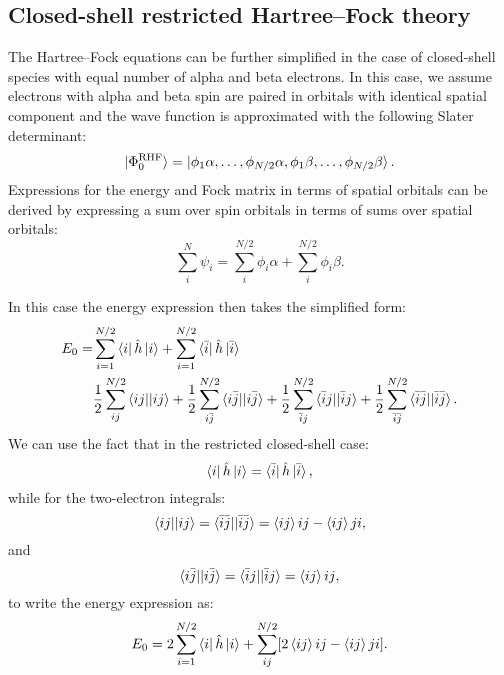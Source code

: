 \documentclass[../Main/chem532-notes.tex]{subfiles}
\begin{document}
\subsection{Closed-shell restricted Hartree--Fock theory}
The Hartree--Fock equations can be further simplified in the case of closed-shell species with equal number of alpha and beta electrons.
In this case, we assume electrons with alpha and beta spin are paired in orbitals with identical spatial component and the wave function is approximated with the following Slater determinant:
\begin{equation}
\ket{\Phi_0^\mathrm{RHF}} = \ket{\phi_1 \alpha,\ldots, \phi_{N/2} \alpha,
\phi_1 \beta,\ldots, \phi_{N/2} \beta}.
\end{equation}
Expressions for the energy and Fock matrix in terms of spatial orbitals can be derived by expressing a sum over spin orbitals in terms of sums over spatial orbitals:
\begin{equation}
\sum_{i}^{N} \psi_i = \sum_{i}^{N/2} \phi_i \alpha + \sum_{i}^{N/2} \phi_i \beta.
\end{equation}

In this case the energy expression then takes the simplified form:
\begin{equation}
\begin{split}
E_0 =& \sum_{i=1}^{N/2} \bra{i} \hat{h} \ket{i} + \sum_{i = 1}^{N/2} \bra{\bar{i}} \hat{h} \ket{\bar{i}} \\
& \frac{1}{2} \sum_{ij}^{N/2} \bra{ij}\!\ket{ij}
+ \frac{1}{2} \sum_{i\bar{j}}^{N/2} \bra{i\bar{j}}\!\ket{i\bar{j}}
+ \frac{1}{2} \sum_{\bar{i}j}^{N/2} \bra{\bar{i}j}\!\ket{\bar{i}j}
+ \frac{1}{2} \sum_{\bar{i}\bar{j}}^{N/2} \bra{\bar{i}\bar{j}}\!\ket{\bar{i}\bar{j}}.
\end{split}
\end{equation}
We can use the fact that in the restricted closed-shell case:
\begin{equation}
\bra{i} \hat{h} \ket{i} = \bra{\bar{i}} \hat{h} \ket{\bar{i}},
\end{equation}
while for the two-electron integrals:
\begin{equation}
\bra{ij}\!\ket{ij} = \bra{\bar{i}\bar{j}}\!\ket{\bar{i}\bar{j}} 
= \braket{ij}{ij} - \braket{ij}{ji},
\end{equation}
and
\begin{equation}
\bra{i\bar{j}}\!\ket{i\bar{j}} = \bra{\bar{i}j}\!\ket{\bar{i}j}  = 
\braket{ij}{ij},
\end{equation}
to write the energy expression as:
\begin{equation}
E_0 = 2 \sum_{i=1}^{N/2} \bra{i} \hat{h} \ket{i} 
+ \sum_{ij}^{N/2} [ 2 \braket{ij}{ij} - \braket{ij}{ji} ].
\end{equation}
\end{document}
